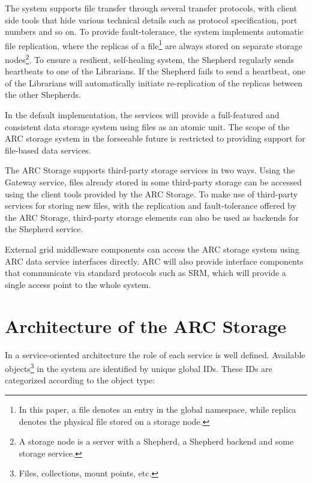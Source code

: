 \documentclass[final]{ieee}
\begin{document}
The system supports file transfer through several transfer protocols,
with client side tools that hide various technical
details such as protocol specification, port numbers
and so on. To provide fault-tolerance, the system implements
automatic file replication, where
the replicas of a file\footnote{In this paper, a file
denotes an entry in the global namespace, while replica denotes the
physical file stored on a storage node.} are always stored on separate
storage nodes\footnote{A
  storage node is a server with a Shepherd, a Shepherd backend
and some storage service.}. To ensure a resilient, self-healing system, the Shepherd
regularly sends heartbeats to one of the Librarians. If the Shepherd fails
to send a heartbeat, one of the Librarians will automatically initiate
re-replication of the replicas between the other Shepherds.

In the default implementation, the services will provide a
full-featured and consistent data storage system using files as an
atomic unit. The scope of the ARC storage system in the forseeable
future is restricted to providing support for file-based data services.

The ARC Storage supports third-party storage services in two
ways. Using the Gateway service, files already stored in some
third-party storage can be accessed using the client tools provided by
the ARC Storage. To make use of third-party services for storing new
files, with the replication and fault-tolerance offered by the ARC
Storage, third-party storage elements can also be used as backends for the
Shepherd service.

External grid middleware components can
access the ARC storage system using ARC data service
interfaces directly. ARC will also provide interface
components that communicate via standard protocols such as SRM, which
will provide a single access point to the whole system.

\section{Architecture of the ARC Storage}
\label{Architecture of the ARC Storage}

In a service-oriented architecture
the role of each service is well defined. Available
objects\footnote{Files, collections, mount points, etc.} in the
system are identified by unique global IDs. These IDs are
categorized according to the object type:
\end{document}
